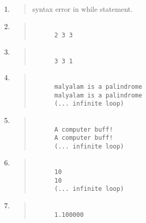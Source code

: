 \documentclass{report}
\begin{document}
\begin{enumerate}
  \item \begin{quote}
      syntax error in while statement.\\
  \end{quote}

  \item \begin{quote}
  \begin{verbatim}
      
      2 3 3
  \end{verbatim}
  \end{quote}

  \item \begin{quote}
  \begin{verbatim}
      
      3 3 1
  \end{verbatim}
  \end{quote}

  \item \begin{quote}
  \begin{verbatim}
      
      malyalam is a palindrome
      malyalam is a palindrome
      (... infinite loop)
  \end{verbatim}
  \end{quote}

  \item \begin{quote}
  \begin{verbatim}
      
      A computer buff!
      A computer buff!
      (... infinite loop)
  \end{verbatim}
  \end{quote}

  \item \begin{quote}
  \begin{verbatim}
      
      10
      10
      (... infinite loop)
  \end{verbatim}
  \end{quote}

  \item \begin{quote}
  \begin{verbatim}
      
      1.100000
  \end{verbatim}
  \end{quote}


\end{enumerate}
\end{document}
